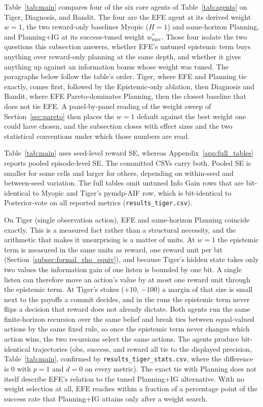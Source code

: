 Table~\ref{tab:main} compares four of the six core agents of Table~\ref{tab:agents} on Tiger, Diagnosis, and Bandit. The four are the EFE agent at its derived weight $w{=}1$, the two reward-only baselines Myopic ($H{=}1$) and same-horizon Planning, and Planning+IG at its success-tuned weight $w^*_{\mathrm{succ}}$. Those four isolate the two questions this subsection answers, whether EFE's untuned epistemic term buys anything over reward-only planning at the same depth, and whether it gives anything up against an information bonus whose weight was tuned. The paragraphs below follow the table's order. Tiger, where EFE and Planning tie exactly, comes first, followed by the Epistemic-only ablation, then Diagnosis and Bandit, where EFE Pareto-dominates Planning, then the closest baseline that does not tie EFE. A panel-by-panel reading of the weight sweep of Section~\ref{sec:pareto} then places the $w{=}1$ default against the best weight one could have chosen, and the subsection closes with effect sizes and the two statistical conventions under which those numbers are read.

Table~\ref{tab:main} uses seed-level reward SE, whereas Appendix~\ref{app:full_tables} reports pooled episode-level SE. The committed CSVs carry both. Pooled SE is smaller for some cells and larger for others, depending on within-seed and between-seed variation. The full tables omit untuned Info Gain rows that are bit-identical to Myopic and Tiger's pymdp-AIF row, which is bit-identical to Posterior-vote on all reported metrics (\texttt{results\_tiger.csv}).

On Tiger (single observation action), EFE and same-horizon Planning coincide exactly. This is a measured fact rather than a structural necessity, and the arithmetic that makes it unsurprising is a matter of units. At $w{=}1$ the epistemic term is measured in the same units as reward, one reward unit per bit (Section~\ref{subsec:formal_rho_equiv}), and because Tiger's hidden state takes only two values the information gain of one listen is bounded by one bit. A single listen can therefore move an action's value by at most one reward unit through the epistemic term. At Tiger's stakes ($+10$, $-100$) a margin of that size is small next to the payoffs a commit decides, and in the runs the epistemic term never flips a decision that reward does not already dictate. Both agents run the same finite-horizon recursion over the same belief and break ties between equal-valued actions by the same fixed rule, so once the epistemic term never changes which action wins, the two recursions select the same actions. The agents produce bit-identical trajectories (obs, success, and reward all tie to the displayed precision, Table~\ref{tab:main}, confirmed by \texttt{results\_\allowbreak tiger\_\allowbreak stats.csv}, where the difference is $0$ with $p{=}1$ and $d{=}0$ on every metric). The exact tie with Planning does not itself describe EFE's relation to the tuned Planning+IG alternative. With no weight selection at all, EFE reaches within a fraction of a percentage point of the success rate that Planning+IG attains only after a weight search.

